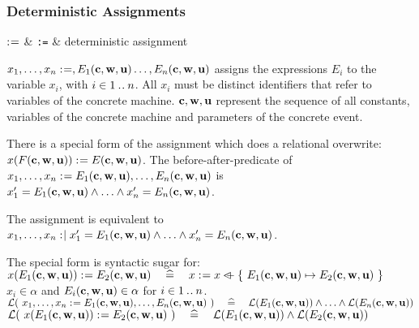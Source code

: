 \subsubsection{Deterministic Assignments}
\label{deterministic_assignments}
\begin{rrnames}
  $\mathrel{:\mkern1mu=}$ & \texttt{:=} & deterministic assignment
\end{rrnames}
\begin{rodinrefentry}
  \rrdesc
    $x_1,\ldots,x_n \mathrel{:\mkern1mu=} ,E_{1}(\mathbf{c},\mathbf{w},\mathbf{u})\ldots,E_{n}(\mathbf{c},\mathbf{w},\mathbf{u})$
    assigns the expressions $E_i$ to the variable $x_i$, with $i\in1\mathbin{.\mkern1mu.} n$.
    All $x_i$ must be distinct identifiers that refer to variables of the concrete machine.
    $\mathbf{c},\mathbf{w},\mathbf{u}$ represent the sequence of all constants, 
    variables of the concrete machine and parameters of the concrete event.

    There is a special form of the assignment which does a relational overwrite:\\
    $x(F(\mathbf{c},\mathbf{w},\mathbf{u})) \mathrel{:\mkern1mu=} E(\mathbf{c},\mathbf{w},\mathbf{u})$.
  \rrdef
    The before-after-predicate of $x_1,\ldots,x_n \mathrel{:\mkern1mu=} E_{1}(\mathbf{c},\mathbf{w},\mathbf{u}),\ldots,E_{n}(\mathbf{c},\mathbf{w},\mathbf{u})$ is\\ $x_1' = E_{1}(\mathbf{c},\mathbf{w},\mathbf{u}) \land \ldots \land x_n' = E_{n}(\mathbf{c},\mathbf{w},\mathbf{u})$.

    The assignment is equivalent to
    $x_1,\ldots,x_n \mathrel{:\mkern1mu\mid} x_1' = E_{1}(\mathbf{c},\mathbf{w},\mathbf{u}) \land \ldots \land x_n' = E_{n}(\mathbf{c},\mathbf{w},\mathbf{u})$.

    The special form is syntactic sugar for:\\
    $x(E_{1}(\mathbf{c},\mathbf{w},\mathbf{u})) \mathrel{:\mkern1mu=} E_{2}(\mathbf{c},\mathbf{w},\mathbf{u})
      \quad\mathrel{\widehat=}\quad 
      x \mathrel{:\mkern1mu=} x \mathbin{\lhd\mkern-9mu-} \{~E_{1}(\mathbf{c},\mathbf{w},\mathbf{u}) \mapsto E_{2}(\mathbf{c},\mathbf{w},\mathbf{u})~\}$
  \rrtypes
    $x_i\in\alpha$ and  $E_{i}(\mathbf{c},\mathbf{w},\mathbf{u})\in\alpha$ for $i \in 1\mathbin{.\mkern1mu.} n$.
  \rrwd
    $\mathcal{L}(~x_1,\ldots,x_n \mathrel{:\mkern1mu=} E_{1}(\mathbf{c},\mathbf{w},\mathbf{u}),\ldots,E_{n}(\mathbf{c},\mathbf{w},\mathbf{u})~)
      \quad\mathrel{\widehat=}\quad 
      \mathcal{L}(E_{1}(\mathbf{c},\mathbf{w},\mathbf{u})) \land \ldots \land \mathcal{L}(E_{n}(\mathbf{c},\mathbf{w},\mathbf{u}))$ \\
    $\mathcal{L}(~x(E_{1}(\mathbf{c},\mathbf{w},\mathbf{u})) \mathrel{:\mkern1mu=} E_{2}(\mathbf{c},\mathbf{w},\mathbf{u})~)
    \quad\mathrel{\widehat=}\quad 
    \mathcal{L}(E_{1}(\mathbf{c},\mathbf{w},\mathbf{u})) \land \mathcal{L}(E_{2}(\mathbf{c},\mathbf{w},\mathbf{u}))$
\end{rodinrefentry}

